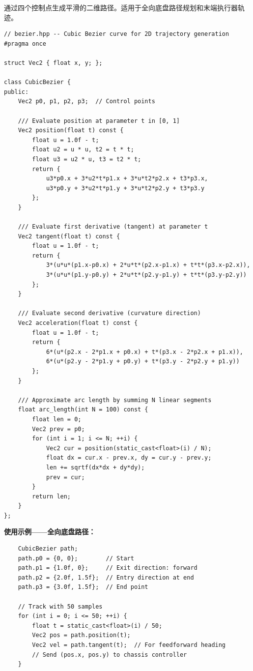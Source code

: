 通过四个控制点生成平滑的二维路径。适用于全向底盘路径规划和末端执行器轨迹。

\begin{verbatim}
// bezier.hpp -- Cubic Bezier curve for 2D trajectory generation
#pragma once

struct Vec2 { float x, y; };

class CubicBezier {
public:
    Vec2 p0, p1, p2, p3;  // Control points

    /// Evaluate position at parameter t in [0, 1]
    Vec2 position(float t) const {
        float u = 1.0f - t;
        float u2 = u * u, t2 = t * t;
        float u3 = u2 * u, t3 = t2 * t;
        return {
            u3*p0.x + 3*u2*t*p1.x + 3*u*t2*p2.x + t3*p3.x,
            u3*p0.y + 3*u2*t*p1.y + 3*u*t2*p2.y + t3*p3.y
        };
    }

    /// Evaluate first derivative (tangent) at parameter t
    Vec2 tangent(float t) const {
        float u = 1.0f - t;
        return {
            3*(u*u*(p1.x-p0.x) + 2*u*t*(p2.x-p1.x) + t*t*(p3.x-p2.x)),
            3*(u*u*(p1.y-p0.y) + 2*u*t*(p2.y-p1.y) + t*t*(p3.y-p2.y))
        };
    }

    /// Evaluate second derivative (curvature direction)
    Vec2 acceleration(float t) const {
        float u = 1.0f - t;
        return {
            6*(u*(p2.x - 2*p1.x + p0.x) + t*(p3.x - 2*p2.x + p1.x)),
            6*(u*(p2.y - 2*p1.y + p0.y) + t*(p3.y - 2*p2.y + p1.y))
        };
    }

    /// Approximate arc length by summing N linear segments
    float arc_length(int N = 100) const {
        float len = 0;
        Vec2 prev = p0;
        for (int i = 1; i <= N; ++i) {
            Vec2 cur = position(static_cast<float>(i) / N);
            float dx = cur.x - prev.x, dy = cur.y - prev.y;
            len += sqrtf(dx*dx + dy*dy);
            prev = cur;
        }
        return len;
    }
};
\end{verbatim}

\textbf{使用示例——全向底盘路径：}
\begin{verbatim}
    CubicBezier path;
    path.p0 = {0, 0};        // Start
    path.p1 = {1.0f, 0};     // Exit direction: forward
    path.p2 = {2.0f, 1.5f};  // Entry direction at end
    path.p3 = {3.0f, 1.5f};  // End point

    // Track with 50 samples
    for (int i = 0; i <= 50; ++i) {
        float t = static_cast<float>(i) / 50;
        Vec2 pos = path.position(t);
        Vec2 vel = path.tangent(t);  // For feedforward heading
        // Send (pos.x, pos.y) to chassis controller
    }
\end{verbatim}


